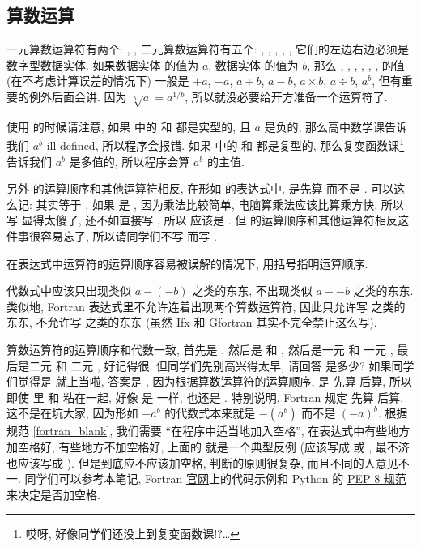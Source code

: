 \subsection{算数运算}\label{fortran_numeric_operator}

一元算数运算符有两个: \ttt{+}, \ttt{-}, 二元算数运算符有五个: \ttt{+}, \ttt{-}, \ttt{*}, \ttt{/}, \ttt{**}, 它们的左边右边必须是数字型数据实体. 如果数据实体 \ttt{[a]} 的值为 $a$, 数据实体 \ttt{[b]} 的值为 $b$, 那么 \ttt{+[a]}, \ttt{-[a]}, \ttt{[a]+[b]}, \ttt{[a]-[b]}, \ttt{[a]*[b]}, \ttt{[a]/[b]}, \ttt{[a]**[b]} 的值 (在不考虑计算误差的情况下) 一般是 $+a$, $-a$, $a+b$, $a-b$, $a\times b$, $a\div b$, $a^b$, 但有重要的例外后面会讲. 因为 $\sqrt[b]{a}=a^{1/b}$, 所以就没必要给开方准备一个运算符了.

使用 \ttt{**} 的时候请注意, 如果 \ttt{[a]**[b]} 中的 \ttt{[a]} 和 \ttt{[b]} 都是实型的, 且 $a$ 是负的, 那么高中数学课告诉我们 $a^b$ ill defined, 所以程序会报错. 如果 \ttt{[a]**[b]} 中的 \ttt{[a]} 和 \ttt{[b]} 都是复型的, 那么复变函数课\footnote{哎呀, 好像同学们还没上到复变函数课!?\dots{}}告诉我们 $a^b$ 是多值的, 所以程序会算 $a^b$ 的主值.

另外 \ttt{**} 的运算顺序和其他运算符相反, 在形如 \ttt{[a]**[b]**[c]} 的表达式中, 是先算 \ttt{[b]**[c]} 而不是 \ttt{[a]**[b]}. 可以这么记: \ttt{([a]**[b])**[c]} 其实等于 \ttt{[a]**([b]*[c])}, 如果 \ttt{[a]**[b]**[c]} 是 \ttt{([a]**[b])**[c]}, 因为乘法比较简单, 电脑算乘法应该比算乘方快, 所以写 \ttt{[a]**[b]**[c]} 显得太傻了, 还不如直接写 \ttt{[a]**([b]*[c])}, 所以 \ttt{[a]**[b]**[c]} 应该是 \ttt{[a]**([b]**[c])}. 但 \ttt{**} 的运算顺序和其他运算符相反这件事很容易忘了, 所以请同学们不写 \ttt{[a]**[b]**[c]} 而写 \ttt{[a]**([b]**[c])}.
\begin{convention}\label{use_parentheses}
    在表达式中运算符的运算顺序容易被误解的情况下, 用括号指明运算顺序.
\end{convention}

代数式中应该只出现类似 $a-(-b)$ 之类的东东, 不出现类似 $a--b$ 之类的东东. 类似地, Fortran 表达式里不允许连着出现两个算数运算符, 因此只允许写 \ttt{[a] - (-[b])} 之类的东东, 不允许写 \ttt{[a] - -[b]} 之类的东东 (虽然 Ifx 和 Gfortran 其实不完全禁止这么写).

算数运算符的运算顺序和代数一致, 首先是 \ttt{**}, 然后是 \ttt{*} 和 \ttt{/}, 然后是一元 \ttt{+} 和 一元 \ttt{-}, 最后是二元 \ttt{+} 和 二元 \ttt{-}, 好记得很. 但同学们先别高兴得太早, 请回答  是多少? 如果同学们觉得是  就上当啦, 答案是 , 因为根据算数运算符的运算顺序, 是 \ttt{**} 先算 \ttt{-} 后算, 所以即使  里 \ttt{-} 和  粘在一起, 好像  是  一样,  也还是 . 特别说明, Fortran 规定 \ttt{**} 先算 \ttt{-} 后算, 这不是在坑大家, 因为形如 $-a^b$ 的代数式本来就是 $-(a^b)$ 而不是 $(-a)^b$. 根据规范 \ref{fortran_blank}, 我们需要 ``在程序中适当地加入空格'', 在表达式中有些地方加空格好, 有些地方不加空格好, 上面的  就是一个典型反例 (应该写成  或 , 最不济也应该写成 ). 但是到底应不应该加空格, 判断的原则很复杂, 而且不同的人意见不一. 同学们可以参考本笔记, Fortran \href{https://fortran-lang.org/}{官网}上的代码示例和 Python 的 \href{https://peps.python.org/pep-0008/}{PEP 8 规范}来决定是否加空格.

